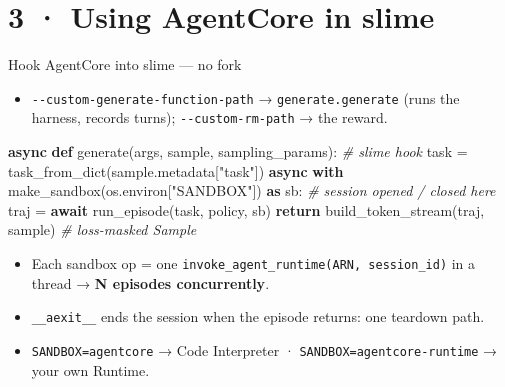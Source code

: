 \documentclass[
  10pt,
  ignorenonframetext,
  aspectratio=169,
  t]{beamer}
\newenvironment{Shaded}{}{}
\newcommand{\CommentTok}[1]{\textcolor[rgb]{0.38,0.63,0.69}{\textit{#1}}}
\newcommand{\ControlFlowTok}[1]{\textcolor[rgb]{0.00,0.44,0.13}{\textbf{#1}}}
\newcommand{\ImportTok}[1]{\textcolor[rgb]{0.00,0.50,0.00}{\textbf{#1}}}
\newcommand{\KeywordTok}[1]{\textcolor[rgb]{0.00,0.44,0.13}{\textbf{#1}}}
\newcommand{\NormalTok}[1]{#1}
\newcommand{\OperatorTok}[1]{\textcolor[rgb]{0.40,0.40,0.40}{#1}}
\newcommand{\StringTok}[1]{\textcolor[rgb]{0.25,0.44,0.63}{#1}}
\providecommand{\tightlist}{%
  \setlength{\itemsep}{0pt}\setlength{\parskip}{0pt}}
\begin{document}
\hypertarget{using-agentcore-in-slime}{%
\section{3 · Using AgentCore in slime}\label{using-agentcore-in-slime}}

\begin{frame}{Hook AgentCore into slime --- no fork}
\protect\hypertarget{hook-agentcore-into-slime-no-fork}{}
\begin{itemize}
\tightlist
\item
  \texttt{-\/-custom-generate-function-path} →
  \texttt{generate.generate} (runs the harness, records turns);
  \texttt{-\/-custom-rm-path} → the reward.
\end{itemize}

\begin{Shaded}
\begin{Highlighting}[]
\ControlFlowTok{async} \KeywordTok{def}\NormalTok{ generate(args, sample, sampling\_params):        }\CommentTok{\# slime hook}
\NormalTok{    task }\OperatorTok{=}\NormalTok{ task\_from\_dict(sample.metadata[}\StringTok{"task"}\NormalTok{])}
    \ControlFlowTok{async} \ControlFlowTok{with}\NormalTok{ make\_sandbox(os.environ[}\StringTok{"SANDBOX"}\NormalTok{]) }\ImportTok{as}\NormalTok{ sb:  }\CommentTok{\# session opened / closed here}
\NormalTok{        traj }\OperatorTok{=} \ControlFlowTok{await}\NormalTok{ run\_episode(task, policy, sb)}
    \ControlFlowTok{return}\NormalTok{ build\_token\_stream(traj, sample)               }\CommentTok{\# loss{-}masked Sample}
\end{Highlighting}
\end{Shaded}

\begin{itemize}
\tightlist
\item
  Each sandbox op = one
  \texttt{invoke\_agent\_runtime(ARN,\ session\_id)} in a thread →
  \textbf{N episodes concurrently}.
\item
  \texttt{\_\_aexit\_\_} ends the session when the episode returns: one
  teardown path.
\item
  \texttt{SANDBOX=agentcore} → Code Interpreter ·
  \texttt{SANDBOX=agentcore-runtime} → your own Runtime.
\end{itemize}
\end{frame}
\end{document}
